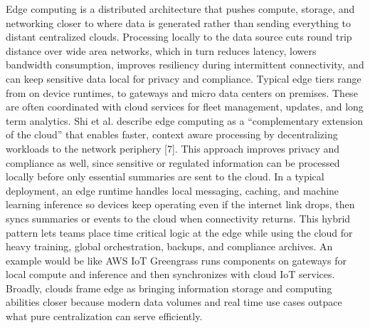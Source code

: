 \documentclass[conference]{IEEEtran}
\begin{document}
Edge computing is a distributed architecture that pushes compute, storage, and networking closer to where data is generated rather than sending everything to distant centralized clouds. Processing locally to the data source cuts round trip distance over wide area networks, which in turn reduces latency, lowers bandwidth consumption, improves resiliency during intermittent connectivity, and can keep sensitive data local for privacy and compliance. Typical edge tiers range from on device runtimes, to gateways and micro data centers on premises. These are often coordinated with cloud services for fleet management, updates, and long term analytics. Shi et al. describe edge computing as a “complementary extension of the cloud” that enables faster, context aware processing by decentralizing workloads to the network periphery [7]. This approach improves privacy and compliance as well, since sensitive or regulated information can be processed locally before only essential summaries are sent to the cloud.
In a typical deployment, an edge runtime handles local messaging, caching, and machine learning inference so devices keep operating even if the internet link drops, then syncs summaries or events to the cloud when connectivity returns. This hybrid pattern lets teams place time critical logic at the edge while using the cloud for heavy training, global orchestration, backups, and compliance archives. An example would be like AWS IoT Greengrass runs components on gateways for local compute and inference and then synchronizes with cloud IoT services. Broadly, clouds frame edge as bringing information storage and computing abilities closer because modern data volumes and real time use cases outpace what pure centralization can serve efficiently.
\end{document}

